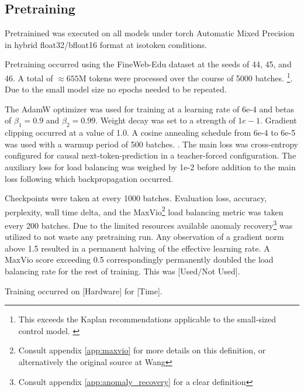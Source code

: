 \documentclass[11pt]{article}
\begin{document}
\subsection{Pretraining}

Pretrainined was executed on all models under torch Automatic Mixed Precision in hybrid float32/bfloat16 format at isotoken conditions.

Pretraining occurred using the FineWeb-Edu dataset at the seeds of 44, 45, and 46. \cite{penedo2024fineweb} A total of $\approx 655\mathrm{M}$ tokens were processed over the course of 5000 batches. \footnote{This exceeds the Kaplan recommendations applicable to the small-sized control model. \cite{kaplan2020scaling}}. Due to the small model size no epochs needed to be repeated.

The AdamW optimizer was used for training at a learning rate of 6e-4 and betas of $\beta_1=0.9$ and $\beta_2 = 0.99$. Weight decay was set to a strength of  $1e-1$. Gradient clipping occurred at a value of 1.0. A cosine annealing schedule from 6e-4 to 6e-5 was used with a warmup period of 500 batches. \cite{radford2019language}. The main loss was cross-entropy configured for causal next-token-prediction in a teacher-forced configuration. The auxiliary loss for load balancing was weighed by 1e-2 before addition to the main loss following which backpropagation occurred. \cite{fedus2021switch}

Checkpoints were taken at every 1000 batches. Evaluation loss, accuracy, perplexity, wall time delta, and the MaxVio\footnote{Consult appendix \ref{app:maxvio} for more details on this definition, or alternatively the original source at Wang\cite{wang2024auxiliarylossfree}} load balancing metric was taken every 200 batches. Due to the limited resources available anomaly recovery\footnote{Consult appendix \ref{app:anomaly_recovery} for a clear definition} was utilized to not waste any pretraining run. Any observation of a gradient norm above 1.5 resulted in a permanent halving of the effective learning rate. A MaxVio score exceeding 0.5 correspondingly permanently doubled the load balancing rate for the rest of training. This was [Used/Not Used].

Training occurred on [Hardware] for [Time].
\end{document}

